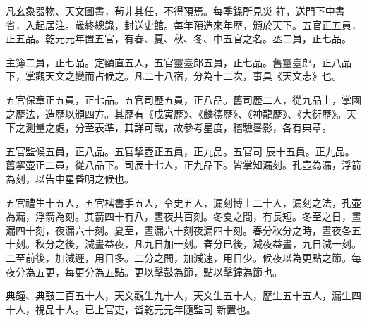 \begin{pinyinscope}
 凡玄象器物、天文圖書，茍非其任，不得預焉。每季錄所見災
 祥，送門下中書省，入起居注。歲終總錄，封送史館。每年預造來年歷，頒於天下。五官正五員，正五品。乾元元年置五官，有春、夏、秋、冬、中五官之名。丞二員，正七品。



 主簿二員，正七品。定額直五人，五官靈臺郎五員，正七品。舊靈臺郎，正八品下，掌觀天文之變而占候之。凡二十八宿，分為十二次，事具《天文志》也。



 五官保章正五員，正七品。五官司歷五員，正八品。舊司歷二人，從九品上，掌國之歷法，造歷以頒四方。其歷有《戊寅歷》、《麟德歷》、《神龍歷》、《大衍歷》。天下之測量之處，分至表準，其詳可載，故參考星度，稽驗晷影，各有典章。



 五官監候五員，正八品。五官挈壺正五員，正九品。五官司
 辰十五員。正九品。舊挈壺正二員，從八品下。司辰十七人，正九品下。皆掌知漏刻。孔壺為漏，浮箭為刻，以告中星昏明之候也。



 五官禮生十五人，五官楷書手五人，令史五人，漏刻博士二十人，漏刻之法，孔壺為漏，浮箭為刻。其箭四十有八，晝夜共百刻。冬夏之間，有長短。冬至之日，晝漏四十刻，夜漏六十刻。夏至，晝漏六十刻夜漏四十刻。春分秋分之時，晝夜各五十刻。秋分之後，減晝益夜，凡九日加一刻。春分已後，減夜益晝，九日減一刻。二至前後，加減遲，用日多。二分之間，加減速，用日少。候夜以為更點之節。每夜分為五更，每更分為五點。更以擊鼓為節，點以擊鐘為節也。



 典鐘、典鼓三百五十人，天文觀生九十人，天文生五十人，歷生五十五人，漏生四十人，視品十人。已上官吏，皆乾元元年隨監司
 新置也。



\end{pinyinscope}